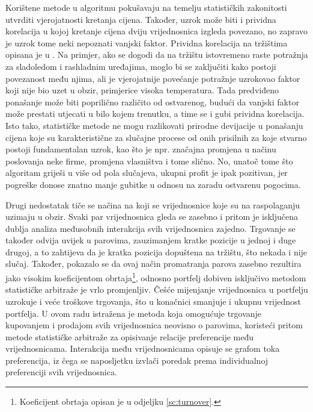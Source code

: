 \documentclass[lmodern, utf8, diplomski, numeric]{fer}
\begin{document}
  Korištene metode u algoritmu pokušavaju na temelju statističkih zakonitosti utvrditi vjerojatnosti kretanja cijena.
  Također, uzrok može biti i prividna korelacija  u kojoj kretanje cijena dviju vrijednosnica izgleda povezano, no zapravo je uzrok tome neki nepoznati vanjski faktor.
  Prividna korelacija na tržištima opisana je u \citep{spurious}.
  Na primjer, ako se dogodi da na tržištu istovremeno raste potražnja za sladoledom i rashladnim uređajima, moglo bi se zaključiti kako postoji povezanost među njima, ali je vjerojatnije povećanje potražnje uzrokovao faktor koji nije bio uzet u obzir, primjerice visoka temperatura.
  Tada predviđeno ponašanje može biti poprilično različito od ostvarenog, budući da vanjski faktor može prestati utjecati u bilo kojem trenutku, a time se i gubi prividna korelacija.
  Isto tako, statističke metode ne mogu razlikovati prirodne devijacije u ponašanju cijena koje su karakteristične za slučajne procese od onih prisilnih za koje stvarno postoji fundamentalan uzrok, kao što je npr. značajna promjena u načinu poslovanja neke firme, promjena vlasništva i tome slično.
  No, unatoč tome što algoritam griješi u više od pola slučajeva, ukupni profit je ipak pozitivan, jer pogreške donose znatno manje gubitke u odnosu na zaradu ostvarenu pogocima.
  
  Drugi nedostatak tiče se načina na koji se vrijednosnice koje su na raspolaganju uzimaju u obzir.
  Svaki par vrijednosnica gleda se zasebno i pritom je isključena dublja analiza međusobnih interakcija svih vrijednosnica zajedno.
  Trgovanje se također odvija uvijek u parovima, zauzimanjem kratke pozicije u jednoj i duge drugoj, a to zahtijeva da je kratka pozicija dopuštena na tržištu, što nekada i nije slučaj.
  Također, pokazalo se da ovaj način promatranja parova zasebno rezultira jako visokim koeficijentom obrtaja\footnote{Koeficijent obrtaja opisan je u odjeljku \ref{sc:turnover}.}, odnosno portfelj dobiven isključivo metodom statističke arbitraže je vrlo promjenljiv.
  Češće mijenjanje vrijednosnica u portfelju uzrokuje i veće troškove trgovanja, što u konačnici smanjuje i ukupnu vrijednost portfelja.
  U ovom radu istražena je metoda koja omogućuje trgovanje kupovanjem i prodajom svih vrijednosnica neovisno o parovima, koristeći pritom metode statističke arbitraže za opisivanje relacije preferencije među vrijednosnicama.
  Interakcija među vrijednosnicama opisuje se grafom toka preferencija, iz čega se naposljetku izvlači poredak prema individualnoj preferenciji svih vrijednosnica.
  
\end{document}
